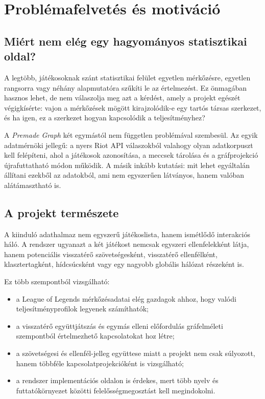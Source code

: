 \chapter{Problémafelvetés és motiváció}

\section{Miért nem elég egy hagyományos statisztikai oldal?}

A legtöbb, játékosoknak szánt statisztikai felület egyetlen mérkőzésre, egyetlen rangsorra vagy néhány alapmutatóra szűkíti le az értelmezést. Ez önmagában hasznos lehet, de nem válaszolja meg azt a kérdést, amely a projekt egészét végigkísérte: vajon a mérkőzések mögött kirajzolódik-e egy tartós társas szerkezet, és ha igen, ez a szerkezet hogyan kapcsolódik a teljesítményhez?

A \emph{Premade Graph} két egymástól nem független problémával szembesül. Az egyik adatmérnöki jellegű: a nyers Riot API válaszokból valahogy olyan adatkorpuszt kell felépíteni, ahol a játékosok azonosítása, a meccsek tárolása és a gráfprojekció újrafuttatható módon működik. A másik inkább kutatási: mit lehet egyáltalán állítani ezekből az adatokból, ami nem egyszerűen látványos, hanem valóban alátámasztható is.

\section{A projekt természete}

A kiinduló adathalmaz nem egyszerű játékoslista, hanem ismétlődő interakciós háló. A rendszer ugyanazt a két játékost nemcsak egyszeri ellenfelekként látja, hanem potenciális visszatérő szövetségesként, visszatérő ellenfélként, klasztertagként, hídcsúcsként vagy egy nagyobb globális hálózat részeként is.

Ez több szempontból vizsgálható:

\begin{itemize}
    \item a League of Legends mérkőzésadatai elég gazdagok ahhoz, hogy valódi teljesítményprofilok legyenek számíthatók;
    \item a visszatérő együttjátszás és egymás elleni előfordulás gráfelméleti szempontból értelmezhető kapcsolatokat hoz létre;
    \item a szövetségesi és ellenfél-jelleg együttese miatt a projekt nem csak súlyozott, hanem többféle kapcsolatprojekcióként is vizsgálható;
    \item a rendszer implementációs oldalon is érdekes, mert több nyelv és futtatókörnyezet közötti felelősségmegosztást kell megindokolni.
\end{itemize}

